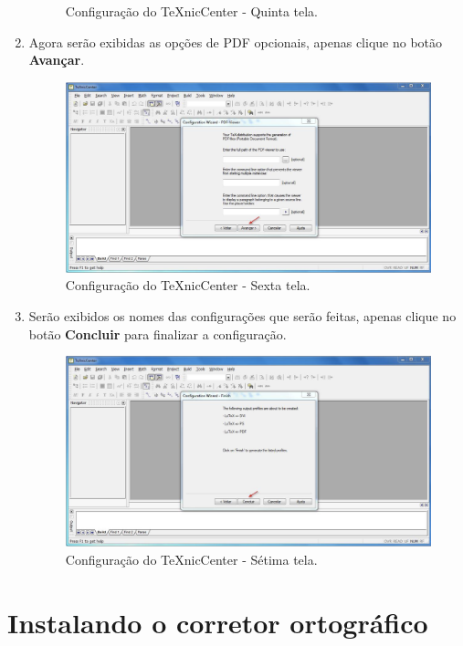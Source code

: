 \begin{enumerate}
\begin{figure}[H]
  \caption{Configuração do TeXnicCenter - Quinta tela.}
\end{figure}
\item Agora serão exibidas as opções de PDF opcionais, apenas clique no botão \textbf{Avançar}.
\begin{figure}[H]
  \centering
  \includegraphics[width=1.0\textwidth]{./fig/texniccenter17}
  \caption{Configuração do TeXnicCenter - Sexta tela.}
\end{figure}
\item Serão exibidos os nomes das configurações que serão feitas, apenas clique no botão \textbf{Concluir} para finalizar a configuração.
\begin{figure}[H]
  \centering
  \includegraphics[width=1.0\textwidth]{./fig/texniccenter18}
  \caption{Configuração do TeXnicCenter - Sétima tela.}
\end{figure}
\end{enumerate}

\section{Instalando o corretor ortográfico}

